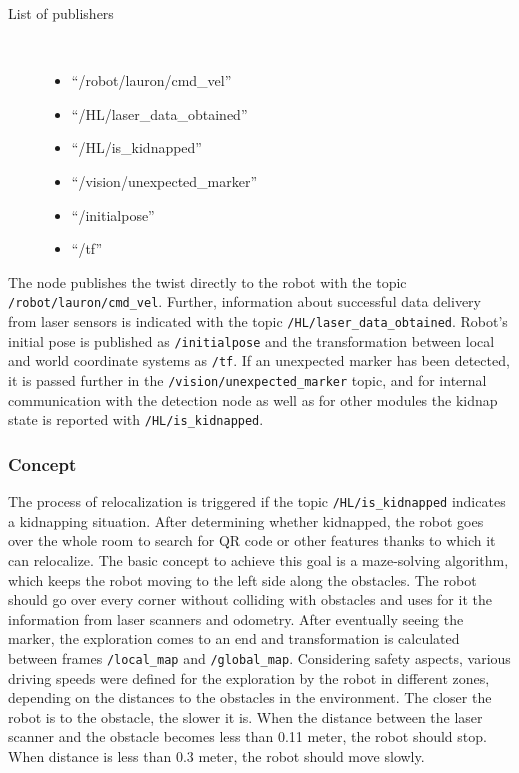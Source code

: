 \begin{description}	
\item[List of publishers]\
	\begin{itemize}
	\item ``/robot/lauron/cmd\_vel''
	\item ``/HL/laser\_data\_obtained''
	\item ``/HL/is\_kidnapped''
	\item ``/vision/unexpected\_marker''
	\item ``/initialpose''
	\item ``/tf''
	\end{itemize}
\end{description}

The node publishes the twist directly to the robot with the topic \texttt{/robot/lauron/cmd\_vel}. Further, information about successful data delivery from laser sensors is indicated with the topic \texttt{/HL/laser\_data\_obtained}. Robot's initial pose is published as \texttt{/initialpose} and the transformation between local and world coordinate systems as \texttt{/tf}. If an unexpected marker has been detected, it is passed further in the \texttt{/vision/unexpected\_marker} topic, and for internal communication with the detection node as well as for other modules the kidnap state is reported with \texttt{/HL/is\_kidnapped}.

\subsubsection{Concept}
The process of relocalization is triggered if the topic \texttt{/HL/is\_kidnapped} indicates a kidnapping situation. After determining whether kidnapped, the robot goes over the whole room to search for QR code or other features thanks to which it can relocalize. The basic concept to achieve this goal is a maze-solving algorithm, which keeps the robot moving to the left side along the obstacles. The robot should go over every corner without colliding with obstacles and uses for it the information from laser scanners and odometry. After eventually seeing the marker, the exploration comes to an end and transformation is calculated between frames \texttt{/local\_map} and \texttt{/global\_map}. Considering safety aspects, various driving speeds were defined for the exploration by the robot in different zones, depending on the distances to the obstacles in the environment. The closer the robot is to the obstacle, the slower it is. When the distance between the laser scanner and the obstacle becomes less than 0.11 meter, the robot should stop. When distance is less than 0.3 meter, the robot should move slowly.

